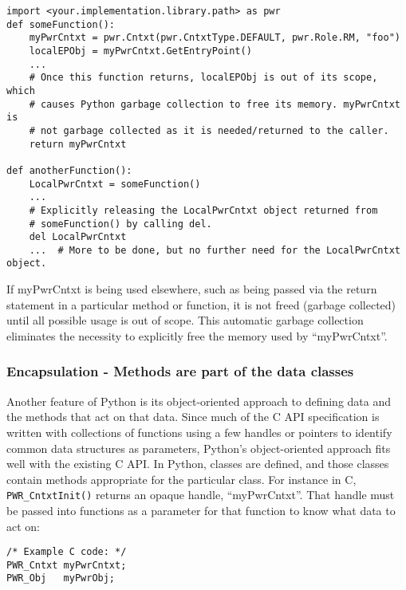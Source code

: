 \documentclass[12pt]{report} %
\begin{document}
\begin{appendices}
\begin{center}\begin{minipage}{.95\linewidth}\begin{lstlisting}
import <your.implementation.library.path> as pwr
def someFunction():
    myPwrCntxt = pwr.Cntxt(pwr.CntxtType.DEFAULT, pwr.Role.RM, "foo")
    localEPObj = myPwrCntxt.GetEntryPoint()
    ...
    # Once this function returns, localEPObj is out of its scope, which
    # causes Python garbage collection to free its memory. myPwrCntxt is
    # not garbage collected as it is needed/returned to the caller.
    return myPwrCntxt

def anotherFunction():
    LocalPwrCntxt = someFunction()
    ...
    # Explicitly releasing the LocalPwrCntxt object returned from
    # someFunction() by calling del.
    del LocalPwrCntxt
    ...  # More to be done, but no further need for the LocalPwrCntxt object.
\end{lstlisting}\end{minipage}\end{center}

If myPwrCntxt is being used elsewhere, such as being passed via the return
statement in a particular method or function, it is not freed (garbage
collected) until all possible usage is out of scope. This automatic garbage
collection eliminates the necessity to explicitly free the memory used by
``myPwrCntxt''.

\subsubsection{Encapsulation - Methods are part of the data classes}
\label{sec:PythonEncapsulation}

Another feature of Python is its object-oriented approach to defining data and
the methods that act on that data. Since much of the C API specification is
written with collections of functions using a few handles or pointers to
identify common data structures as parameters, Python's object-oriented
approach fits well with the existing C API. In Python, classes are defined, and
those classes contain methods appropriate for the particular class. For
instance in C, \texttt{PWR_CntxtInit()} returns an opaque handle,
``myPwrCntxt''. That handle must be passed into functions as a parameter for
that function to know what data to act on:

\begin{center}\begin{minipage}{.95\linewidth}\begin{lstlisting}
/* Example C code: */
PWR_Cntxt myPwrCntxt;
PWR_Obj   myPwrObj;


\end{lstlisting}
\end{minipage}
\end{center}
\end{appendices}
\end{document}
